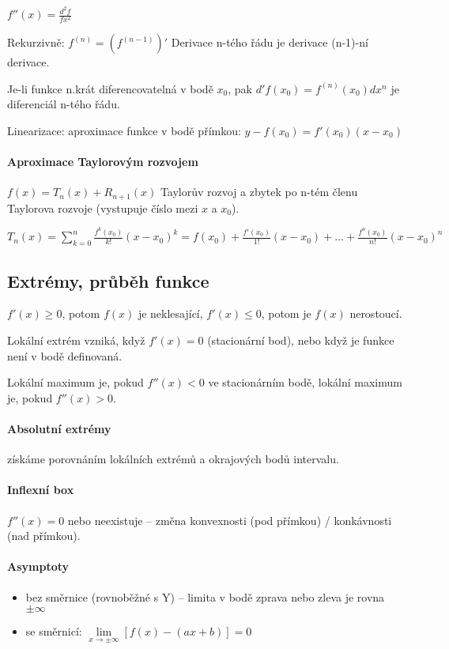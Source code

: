 \documentclass[a4paper, 11pt]{report}
\begin{document}
$f''(x) = \frac{d^2f}{fx^2}$

Rekurzivně: $f^{(n)} = \left( f^{(n-1)} \right)'$ Derivace n-tého řádu je derivace (n-1)-ní derivace.

Je-li funkce n.krát diferencovatelná v bodě $x_0$, pak $d' f(x_0) = f^{(n)} (x_0) dx^n$ je diferenciál n-tého řádu.

Linearizace: aproximace funkce v bodě přímkou: $y - f(x_0) = f'(x_0) (x-x_0)$

\paragraph{Aproximace Taylorovým rozvojem}

$f(x) = T_n(x) + R_{n+1}(x)$ Taylorův rozvoj a zbytek po n-tém členu Taylorova rozvoje (vystupuje číslo mezi $x$ a $x_0$).

$T_n(x) = \sum\limits_{k=0}^n \frac{f^{k}(x_0)}{k!} (x-x_0)^k = f(x_0) + \frac{f'(x_0)}{1!} (x-x_0) + \dots + \frac{f^{n}(x_0)}{n!} (x-x_0)^n$

\subsection{Extrémy, průběh funkce}

$f'(x) \geq 0$, potom $f(x)$ je neklesající, $f'(x) \leq 0$, potom je $f(x)$ nerostoucí.

Lokální extrém vzniká, když $f'(x) = 0$ (stacionární bod), nebo když je funkce není v bodě definovaná. 

Lokální maximum je, pokud $f''(x) < 0$ ve stacionárním bodě, 
lokální maximum je, pokud $f''(x) > 0$.

\paragraph{Absolutní extrémy} získáme porovnáním lokálních extrémů a okrajových bodů intervalu.

\paragraph{Inflexní box} $f''(x) = 0$ nebo neexistuje -- změna konvexnosti (pod přímkou) / konkávnosti (nad přímkou).

\paragraph{Asymptoty}
\begin{itemize}
	\item bez směrnice (rovnoběžné s Y) -- limita v bodě zprava nebo zleva je rovna $\pm \infty$
	\item se směrnicí: $\lim\limits_{x \to \pm \infty} \left[ f(x) - (ax + b) \right] = 0$
\end{itemize}
\end{document}
